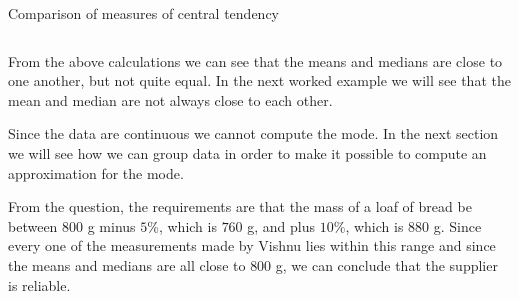 \begin{wex}{Comparison of measures of central tendency}
{\begin{center}
\begin{tabular}{|c|c|c|}
    \end{tabular}
  \end{center}

  From the above calculations we can see that the means and medians
  are close to one another, but not quite equal. In the next worked
  example we will see that the mean and median are not always
  close to each other.


  Since the data are continuous we cannot compute the mode. In the next
  section we will see how we can group data in order to make it possible
  to compute an approximation for the mode.


  From the question, the requirements are that the mass of a loaf of
  bread be between $800$ g minus $5$\%, which is $760$ g, and plus
  $10$\%, which is $880$ g. Since every one of the measurements made
  by Vishnu lies within this range and since the means and medians are
  all close to $800$ g, we can conclude that the supplier is reliable.

}
\end{wex}


